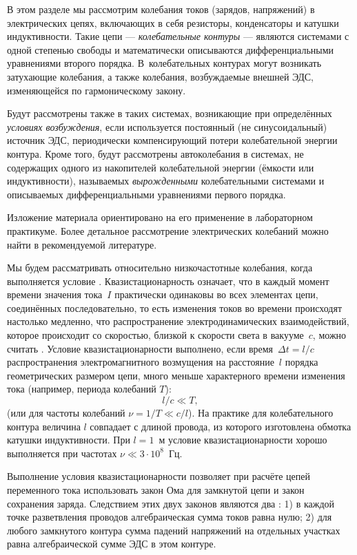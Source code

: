 В этом разделе мы рассмотрим колебания токов (зарядов, напряжений) 
в электрических цепях, включающих в себя резисторы, конденсаторы и катушки 
индуктивности. Такие цепи --- \emph{колебательные контуры} --- являются системами 
с одной степенью свободы и математически описываются дифференциальными 
уравнениями второго порядка. В~колебательных контурах могут возникать 
 затухающие колебания, а также  
колебания, возбуждаемые внешней ЭДС, изменяющейся по гармоническому закону.

Будут рассмотрены также  в таких системах, 
возникающие при определённых \emph{условиях возбуждения}, если используется 
постоянный (не синусоидальный) источник ЭДС, периодически компенсирующий 
потери колебательной энергии контура.
Кроме того, будут рассмотрены автоколебания в системах, не содержащих 
одного из накопителей колебательной энергии (ёмкости или индуктивности), 
называемых \emph{вырожденными} колебательными системами и описываемых 
дифференциальными уравнениями первого порядка.

Изложение материала ориентировано на его применение в лабораторном практикуме. 
Более детальное рассмотрение электрических колебаний можно найти
в рекомендуемой литературе.

Мы будем рассматривать относительно низкочастотные колебания, когда
выполняется условие . Квазистационарность означает, что в
каждый момент времени значения тока~$I$ практически одинаковы во всех элементах
цепи, соединённых последовательно, то есть изменения токов во времени происходят
настолько медленно, что распространение электродинамических взаимодействий,
которое происходит со скоростью, близкой к скорости света в вакууме~$c$, можно
считать . Условие квазистационарности выполнено, если
время~$\Delta t=l/c$ распространения электромагнитного возмущения на расстояние~$l$
порядка геометрических размером цепи, 
много меньше характерного времени изменения тока 
(например, периода колебаний $T$):
\begin{equation*}
l/c\ll T,
\end{equation*}
(или для частоты колебаний $\nu=1/T\ll c/l$). 
На практике для колебательного контура величина $l$ совпадает с длиной провода, 
из которого изготовлена обмотка катушки индуктивности. 
При $l=1$~м условие квазистационарности хорошо
выполняется при частотах $\nu\ll3\cdot10^8$~Гц.

Выполнение условия квазистационарности позволяет при расчёте цепей переменного
тока использовать закон Ома для замкнутой цепи и закон сохранения заряда. 
Следствием этих двух законов являются два :
1) в каждой точке разветвления проводов
алгебраическая сумма токов равна нулю; 2)
для любого замкнутого
контура сумма падений напряжений на отдельных участках равна алгебраической
сумме ЭДС в этом контуре.

